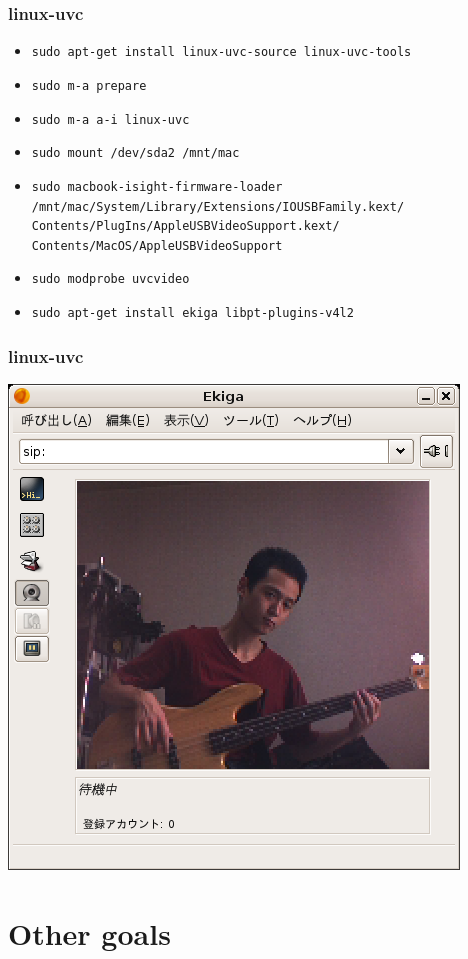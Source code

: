\documentclass[cjk,dvipdfmx]{beamer}
\begin{document}
\begin{frame}
 \frametitle{linux-uvc}
 \begin{itemize}
  \item \texttt{sudo apt-get install linux-uvc-source linux-uvc-tools}
  \item \texttt{sudo m-a prepare}
  \item \texttt{sudo m-a a-i linux-uvc}
  \item \texttt{sudo mount /dev/sda2 /mnt/mac}
  \item \texttt{sudo macbook-isight-firmware-loader \\
       /mnt/mac/System/Library/Extensions/IOUSBFamily.kext/\\Contents/PlugIns/AppleUSBVideoSupport.kext/\\Contents/MacOS/AppleUSBVideoSupport}
  \item \texttt{sudo modprobe uvcvideo}
  \item \texttt{sudo apt-get install ekiga libpt-plugins-v4l2}
 \end{itemize}
\end{frame}

\begin{frame}
 \frametitle{linux-uvc}
 \includegraphics[width=0.8\vsize]{image200607/ekiga.png}
\end{frame}

\section{Other goals}
\end{document}
